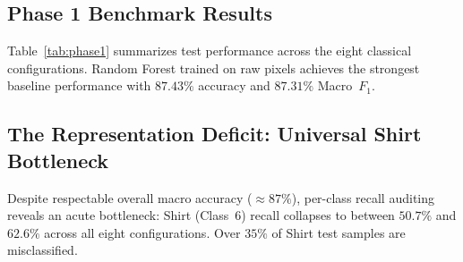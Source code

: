 \documentclass[conference]{IEEEtran}
\begin{document}
\subsection{Phase 1 Benchmark Results}
Table~\ref{tab:phase1} summarizes test performance across the eight classical configurations. Random Forest trained on raw pixels achieves the strongest baseline performance with $87.43\%$ accuracy and $87.31\%$ Macro~$F_1$.

\begin{table}[t]
\centering
\caption{Phase 1 AML Benchmark Results (Test Set, $n=10{,}000$)}
\label{tab:phase1}
\end{table}

\subsection{The Representation Deficit: Universal Shirt Bottleneck}
Despite respectable overall macro accuracy (${\approx}87\%$), per-class recall auditing reveals an acute bottleneck: Shirt (Class~6) recall collapses to between $50.7\%$ and $62.6\%$ across all eight configurations. Over $35\%$ of Shirt test samples are misclassified.
\end{document}
